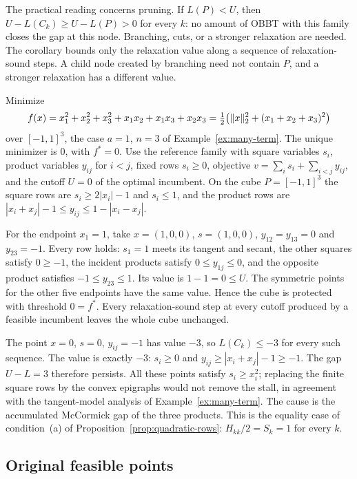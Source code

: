 The practical reading concerns pruning. If $L(P)<U$, then
$U-L(C_k)\ge U-L(P)>0$ for every $k$: no amount of OBBT with this family
closes the gap at this node. Branching, cuts, or a stronger relaxation
are needed. The corollary bounds only the relaxation value along a
sequence of relaxation-sound steps. A child node created by branching need
not contain $P$, and a stronger relaxation has a different value.

\begin{example}\label{ex:three-variable}
Minimize
\[
 f(x)=x_1^2+x_2^2+x_3^2+x_1x_2+x_1x_3+x_2x_3
     =\tfrac12\bigl(\lVert x\rVert_2^2+(x_1+x_2+x_3)^2\bigr)
\]
over $[-1,1]^3$, the case $a=1$, $n=3$ of Example~\ref{ex:many-term}. The
unique minimizer is $0$, with $f^*=0$. Use the reference family with
square variables $s_i$, product variables $y_{ij}$ for $i<j$, fixed rows
$s_i\ge0$, objective $v=\sum_is_i+\sum_{i<j}y_{ij}$, and the cutoff $U=0$
of the optimal incumbent. On the cube $P=[-1,1]^3$ the square rows are
$s_i\ge2|x_i|-1$ and $s_i\le1$, and the product rows are
$|x_i+x_j|-1\le y_{ij}\le1-|x_i-x_j|$.

For the endpoint $x_1=1$, take $x=(1,0,0)$, $s=(1,0,0)$,
$y_{12}=y_{13}=0$ and $y_{23}=-1$. Every row holds: $s_1=1$ meets its
tangent and secant, the other squares satisfy $0\ge-1$, the incident
products satisfy $0\le y_{1j}\le0$, and the opposite product satisfies
$-1\le y_{23}\le1$. Its value is $1-1=0\le U$. The symmetric points for
the other five endpoints have the same value. Hence the cube is protected
with threshold $0=f^*$. Every relaxation-sound step at every cutoff
produced by a feasible incumbent leaves the whole cube unchanged.

The point $x=0$, $s=0$, $y_{ij}=-1$ has value $-3$, so $L(C_k)\le-3$ for
every such sequence. The value is exactly $-3$: $s_i\ge0$ and
$y_{ij}\ge|x_i+x_j|-1\ge-1$. The gap $U-L=3$ therefore persists. All
these points satisfy $s_i\ge x_i^2$; replacing the finite square rows by
the convex epigraphs would not remove the stall, in agreement with the
tangent-model analysis of Example~\ref{ex:many-term}. The cause is the
accumulated McCormick gap of the three products. This is the equality
case of condition~(a) of Proposition~\ref{prop:quadratic-rows}:
$H_{kk}/2=S_k=1$ for every $k$.
\end{example}

\subsection{Original feasible points}\label{sec:cert-original}

